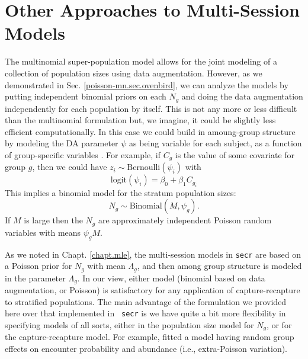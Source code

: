 \section{Other Approaches to Multi-Session Models}

The multinomial super-population model allows for the joint modeling
of a collection of population sizes using data augmentation.  However,
as we demonstrated in Sec. \ref{poisson-mn.sec.ovenbird}, we can
analyze the models by putting independent binomial priors on each
$N_{g}$ and doing the data augmentation independently for each
population by itself.  This is not any more or less difficult than the
multinomial formulation but, we imagine, it could be slightly less
efficient computationally.  In this case we could build in
amoung-group structure by modeling the DA parameter $\psi$ as being
variable for each subject, as a function of group-specific variables
\citep[see][for an example]{hendriks_etal:2013}.  For example, if
$C_{g}$ is the value of some covariate for group $g$, then we could
have $z_{i} \sim \mbox{Bernoulli}( \psi_{i})$ with
\[
 \mbox{logit}(\psi_{i}) = \beta_0 + \beta_1  C_{g_{i}}
\]
This implies a binomial model for the stratum population sizes:
\[
N_{g} \sim \mbox{Binomial}(M, \psi_{g}).
\]
If $M$ is large then the $N_{g}$ are approximately
independent Poisson random variables with means $\psi_{g} M$.

As we noted in Chapt. \ref{chapt.mle}, the multi-session models in
\mbox{\tt secr} are based on a Poisson prior for $N_{g}$ with mean
$\Lambda_{g}$, and then among group structure is modeled in the
parameter $\Lambda_{g}$. In our view, either model (binomial based on
data augmentation, or Poisson) is satisfactory for any application of
capture-recapture to stratified populations.  The main advantage of
the formulation we provided here over that implemented in \mbox{\tt
  secr} is we have quite a bit more flexibility in specifying models
of all sorts, either in the population size model for $N_{g}$, or for
the capture-recapture model. For example, \citet{royle_converse:2013}
fitted a model having random group effects on encounter probability
and abundance (i.e., extra-Poisson variation).

